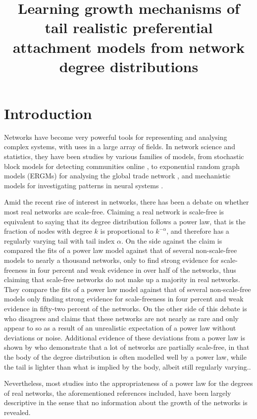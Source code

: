 \documentclass[
  sn-basic,
]{sn-jnl}
\title[Learning growth mechanisms of tail realistic preferential
attachment models from network degree distributions]{Learning growth
mechanisms of tail realistic preferential attachment models from network
degree distributions}
\author[1]{\fnm{Thomas William} \sur{Boughen}}\author[1]{\fnm{Clement} \sur{Lee}}\author[1]{\fnm{Vianey Palacios} \sur{Ramirez}}
\affil[1]{\orgdiv{School of Mathematics, Statistics and
Physics}, \orgname{Newcastle University}}
\theoremstyle{plain}
\theoremstyle{plain}
\theoremstyle{remark}
\begin{document}
\maketitle


\newpage

\section{Introduction}\label{introduction}

Networks have become very powerful tools for representing and analysing
complex systems, with uses in a large array of fields. In network
science and statistics, they have been studies by various families of
models, from stochastic block models for detecting communities online
\citep{Latouche11}, to exponential random graph models (ERGMs) for
analysing the global trade network \citep{Setayesh22}, and mechanistic
models for investigating patterns in neural systems \citep{Betzel17}.

Amid the recent rise of interest in networks, there has been a debate on
whether most real networks are scale-free. Claiming a real network is
scale-free is equivalent to saying that its degree distribution follows
a power law, that is the fraction of nodes with degree \(k\) is
proportional to \(k^{-\alpha}\), and therefore has a regularly varying
tail with tail index \(\alpha\). On the side against the claim is
\citet{Broido_2019who} compared the fits of a power law model against
that of several non-scale-free models to nearly a thousand networks,
only to find strong evidence for scale-freeness in four percent and weak
evidence in over half of the networks, thus claiming that scale-free
networks do not make up a majority in real networks. They compare the
fits of a power law model against that of several non-scale-free models
only finding strong evidence for scale-freeness in four percent and weak
evidence in fifty-two percent of the networks. On the other side of this
debate is \citet{Voitalov_2019} who disagrees and claims that these
networks are not nearly as rare and only appear to so as a result of an
unrealistic expectation of a power law without deviations or noise.
Additional evidence of these deviations from a power law is shown by
\citet{Lee24} who demonstrate that a lot of networks are partially
scale-free, in that the body of the degree distribution is often
modelled well by a power law, while the tail is lighter than what is
implied by the body, albeit still regularly varying..

Nevertheless, most studies into the appropriateness of a power law for
the degrees of real networks, the aforementioned references included,
have been largely descriptive in the sense that no information about the
growth of the networks is revealed.
\end{document}
